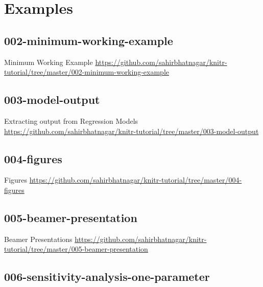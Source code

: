 \documentclass[10pt]{beamer}\usepackage[]{graphicx}\usepackage[]{color}
\begin{document}
\section{Examples}

\subsection{002-minimum-working-example}

\begin{frame}{Minimum Working Example}
\href{https://github.com/sahirbhatnagar/knitr-tutorial/tree/master/002-minimum-working-example}{https://github.com/sahirbhatnagar/knitr-tutorial/tree/master/002-minimum-working-example}
\end{frame}


\subsection{003-model-output}

\begin{frame}{Extracting output from Regression Models}
\href{https://github.com/sahirbhatnagar/knitr-tutorial/tree/master/003-model-output}{https://github.com/sahirbhatnagar/knitr-tutorial/tree/master/003-model-output}
\end{frame}


\subsection{004-figures}

\begin{frame}{Figures}
\href{https://github.com/sahirbhatnagar/knitr-tutorial/tree/master/004-figures}{https://github.com/sahirbhatnagar/knitr-tutorial/tree/master/004-figures}
\end{frame}


\subsection{005-beamer-presentation}

\begin{frame}{Beamer Presentations}
\href{https://github.com/sahirbhatnagar/knitr-tutorial/tree/master/005-beamer-presentation}{https://github.com/sahirbhatnagar/knitr-tutorial/tree/master/005-beamer-presentation}
\end{frame}


\subsection{006-sensitivity-analysis-one-parameter}
\end{document}
